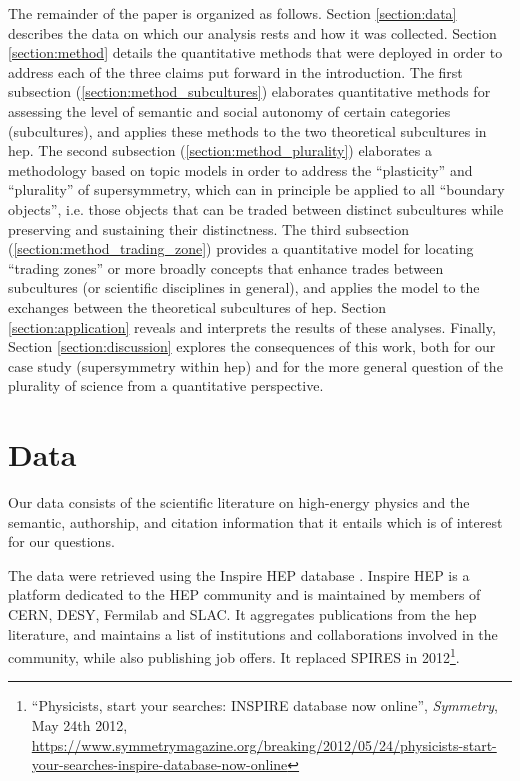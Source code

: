 \documentclass[smallextended]{svjour3}
\begin{document}
The remainder of the paper is organized as follows. Section \ref{section:data} describes the data on which our analysis rests and how it was collected. Section \ref{section:method} details the quantitative methods that were deployed in order to address each of the three claims put forward in the introduction. The first subsection (\ref{section:method_subcultures}) elaborates quantitative methods for assessing the level of semantic and social autonomy of certain categories (subcultures), and applies these methods to the two theoretical subcultures in \gls{hep}. The second subsection (\ref{section:method_plurality}) elaborates a methodology based on topic models in order to address the ``plasticity'' and ``plurality'' of supersymmetry, which can in principle be applied to all ``boundary objects'', i.e. those objects that can be traded between distinct subcultures while preserving and sustaining their distinctness. The third subsection (\ref{section:method_trading_zone}) provides a quantitative model for locating ``trading zones'' or more broadly concepts that enhance trades between subcultures (or scientific disciplines in general), and applies the model to the exchanges between the theoretical subcultures of \gls{hep}. Section \ref{section:application} reveals and interprets the results of these analyses. Finally, Section \ref{section:discussion} explores the consequences of this work, both for our case study (supersymmetry within \gls{hep}) and for the more general question of the plurality of science from a quantitative perspective.

\section{Data\label{section:data}}


Our data consists of the scientific literature on high-energy physics and the semantic, authorship, and citation information that it entails which is of interest for our questions.
 
The data were retrieved using the Inspire HEP database \citep{InspireAPI}. Inspire HEP is a platform dedicated to the HEP community and is maintained by members of CERN, DESY, Fermilab and SLAC. It aggregates publications from the \gls{hep} literature, and maintains a list of institutions and collaborations involved in the community, while also publishing job offers. It replaced SPIRES in 2012\footnote{``Physicists, start your searches: INSPIRE database now online'', \textit{Symmetry}, May 24th 2012, \url{https://www.symmetrymagazine.org/breaking/2012/05/24/physicists-start-your-searches-inspire-database-now-online}
}.
\end{document}
